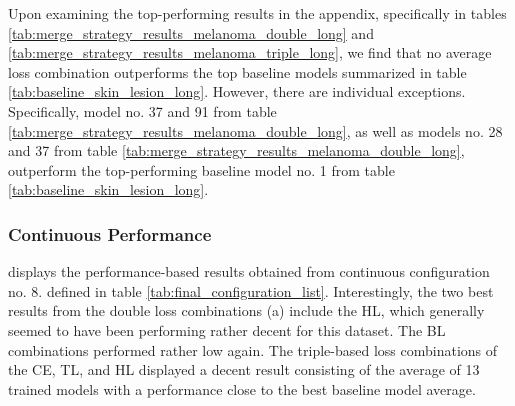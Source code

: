 Upon examining the top-performing results in the appendix, specifically in tables \ref{tab:merge_strategy_results_melanoma_double_long} and \ref{tab:merge_strategy_results_melanoma_triple_long}, we find that no average loss combination outperforms the top baseline models summarized in table \ref{tab:baseline_skin_lesion_long}. However, there are individual exceptions. Specifically, model no. 37 and 91 from table \ref{tab:merge_strategy_results_melanoma_double_long}, as well as models no. 28 and 37 from table \ref{tab:merge_strategy_results_melanoma_double_long}, outperform the top-performing baseline model no. 1 from table \ref{tab:baseline_skin_lesion_long}.

\subsubsection*{Continuous Performance}
 displays the performance-based results obtained from continuous configuration no. 8. defined in table \ref{tab:final_configuration_list}. Interestingly, the two best results from the double loss combinations (a) include the \ac{HL}, which generally seemed to have been performing rather decent for this dataset. The \ac{BL} combinations performed rather low again. The triple-based loss combinations of the CE, TL, and HL displayed a decent result consisting of the average of 13 trained models with a performance close to the best baseline model average.  
\label{subsubsec:continous_melanoma}
